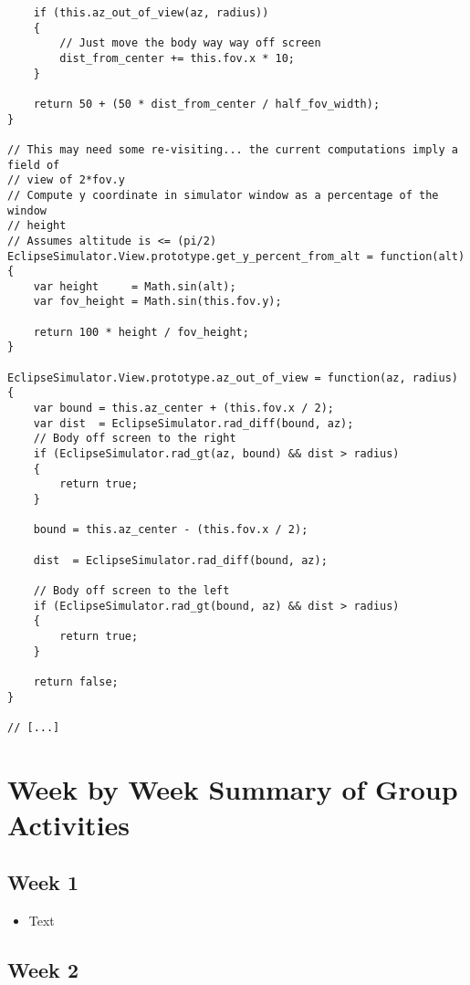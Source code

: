 \documentclass[10pt, onecolumn, draftclsnofoot, letterpaper, compsoc]{IEEEtran}
\begin{document}
\begin{verbatim}
    if (this.az_out_of_view(az, radius))
    {
        // Just move the body way way off screen
        dist_from_center += this.fov.x * 10;
    }

    return 50 + (50 * dist_from_center / half_fov_width);
}

// This may need some re-visiting... the current computations imply a field of
// view of 2*fov.y
// Compute y coordinate in simulator window as a percentage of the window 
// height
// Assumes altitude is <= (pi/2)
EclipseSimulator.View.prototype.get_y_percent_from_alt = function(alt)
{
    var height     = Math.sin(alt);
    var fov_height = Math.sin(this.fov.y);

    return 100 * height / fov_height;
}

EclipseSimulator.View.prototype.az_out_of_view = function(az, radius)
{
    var bound = this.az_center + (this.fov.x / 2);
    var dist  = EclipseSimulator.rad_diff(bound, az);
    // Body off screen to the right
    if (EclipseSimulator.rad_gt(az, bound) && dist > radius)
    {
        return true;
    }

    bound = this.az_center - (this.fov.x / 2);
    
    dist  = EclipseSimulator.rad_diff(bound, az);
    
    // Body off screen to the left
    if (EclipseSimulator.rad_gt(bound, az) && dist > radius)
    {
        return true;
    }
    
    return false;
}

// [...]
\end{verbatim}

\section{Week by Week Summary of Group Activities}

\subsection{Week 1}

\begin{itemize}

\item Text

\end{itemize}

\subsection{Week 2}
\end{document}

